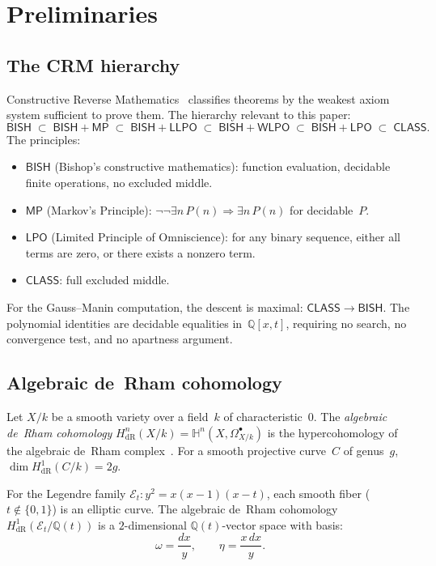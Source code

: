 \documentclass[11pt]{article}
\theoremstyle{plain}
\theoremstyle{definition}
\theoremstyle{remark}
\newcommand{\Q}{\mathbb{Q}}
\newcommand{\BISH}{\mathsf{BISH}}
\newcommand{\LPO}{\mathsf{LPO}}
\newcommand{\WLPO}{\mathsf{WLPO}}
\newcommand{\LLPO}{\mathsf{LLPO}}
\newcommand{\MP}{\mathsf{MP}}
\newcommand{\CLASS}{\mathsf{CLASS}}
\newcommand{\HdR}{H^1_{\mathrm{dR}}}
\begin{document}
\section{Preliminaries}\label{sec:prelim}

\subsection{The CRM hierarchy}

Constructive Reverse Mathematics~\cite{Bishop1967,BridgeRichman1987}
classifies theorems by the weakest axiom system sufficient to
prove them.  The hierarchy relevant to this paper:
\[
  \BISH \;\subset\; \BISH{+}\MP \;\subset\; \BISH{+}\LLPO
  \;\subset\; \BISH{+}\WLPO \;\subset\; \BISH{+}\LPO
  \;\subset\; \CLASS.
\]
The principles:
\begin{itemize}[nosep]
\item $\BISH$ (Bishop's constructive mathematics): function
  evaluation, decidable finite operations, no excluded middle.
\item $\MP$ (Markov's Principle): $\neg\neg\exists n\, P(n)
  \Rightarrow \exists n\, P(n)$ for decidable~$P$.
\item $\LPO$ (Limited Principle of Omniscience): for any binary
  sequence, either all terms are zero, or there exists a nonzero term.
\item $\CLASS$: full excluded middle.
\end{itemize}
For the Gauss--Manin computation, the descent is maximal:
$\CLASS \to \BISH$.  The polynomial identities are decidable
equalities in~$\Q[x, t]$, requiring no search, no convergence
test, and no apartness argument.

\subsection{Algebraic de~Rham cohomology}\label{ssec:deRham}

Let $X/k$ be a smooth variety over a field~$k$ of characteristic~$0$.
The \emph{algebraic de~Rham cohomology}
$H^n_{\mathrm{dR}}(X/k) = \mathbb{H}^n(X, \Omega^\bullet_{X/k})$
is the hypercohomology of the algebraic de~Rham
complex~\cite{Grothendieck1966}.  For a smooth projective
curve~$C$ of genus~$g$, $\dim H^1_{\mathrm{dR}}(C/k) = 2g$.

For the Legendre family $\mathcal{E}_t : y^2 = x(x-1)(x-t)$,
each smooth fiber ($t \notin \{0, 1\}$) is an elliptic curve.
The algebraic de~Rham cohomology $\HdR(\mathcal{E}_t / \Q(t))$
is a $2$-dimensional $\Q(t)$-vector space with basis:
\[
  \omega = \frac{dx}{y}, \qquad
  \eta = \frac{x\,dx}{y}.
\]
\end{document}
